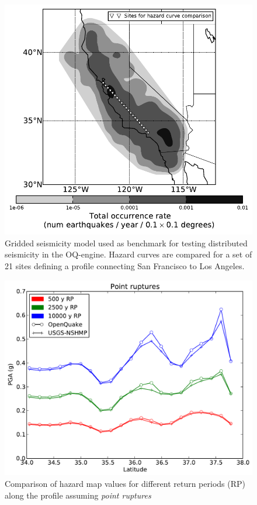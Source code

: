\begin{figure}[htb]
\centering
\includegraphics[width=12cm]{./qareport/pictures/CAmapC_21.pdf}
\caption{Gridded seismicity model used as benchmark for testing distributed seismicity in the OQ-engine. Hazard curves are compared for a set of 21 sites defining a profile connecting San Francisco to Los Angeles.}
\label{fig:cal_grid}
\end{figure}

\begin{figure}[!ht]
\centering
\includegraphics[width=12.5cm]{./qareport/pictures/gridded_seismicity_oq_nshmp_point.pdf}
\caption{Comparison of hazard map values for different return periods (RP) along the profile assuming \textit{point ruptures}}
\label{fig:cal_grid_map_point}
\end{figure}

